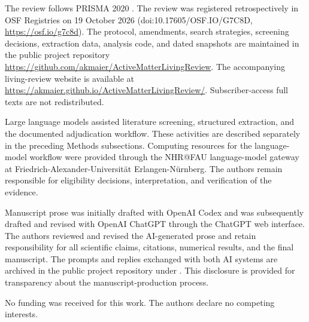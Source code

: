 The review follows PRISMA 2020
\cite{Page2021prisma}. The review was registered retrospectively
in OSF Registries on 19 October 2026
(doi:10.17605/OSF.IO/G7C8D,
\url{https://osf.io/g7c8d}).
The protocol, amendments, search strategies,
screening decisions, extraction data, analysis
code, and dated snapshots are maintained in
the public project repository
\url{https://github.com/akmaier/ActiveMatterLivingReview}.
The accompanying living-review website is available at
\url{https://akmaier.github.io/ActiveMatterLivingReview/}.
Subscriber-access full texts are not
redistributed.

Large language models assisted literature screening,
structured extraction, and the documented
adjudication workflow. These activities are
described separately in the preceding Methods
subsections. Computing resources for the
language-model workflow were provided through
the NHR@FAU language-model gateway at
Friedrich-Alexander-Universit\"at Erlangen-N\"urnberg.
The authors remain responsible
for eligibility decisions, interpretation,
and verification of the evidence.

Manuscript prose was initially drafted with
OpenAI Codex and was subsequently drafted
and revised with OpenAI ChatGPT through the
ChatGPT web interface. The authors reviewed
and revised the AI-generated prose and retain
responsibility for all scientific claims,
citations, numerical results, and the final
manuscript. The prompts and replies exchanged
with both AI systems are archived in the
public project repository under
.
This disclosure is provided for transparency
about the manuscript-production process.

No funding was received for this work.
The authors declare no competing interests.

